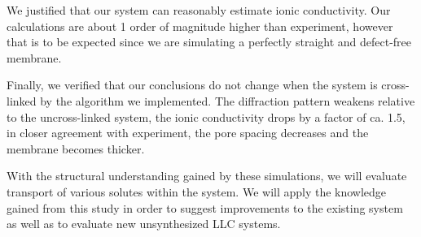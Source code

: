 \documentclass[journal=jpcbfk,manuscript=article]{achemso}
\begin{document}
  We justified that our system can reasonably estimate ionic conductivity.  Our
  calculations are about 1 order of magnitude higher than experiment, however
  that is to be expected since we are simulating a perfectly straight and
  defect-free membrane. 

  Finally, we verified that our conclusions do not change when the system is
  cross-linked by the algorithm we implemented. The diffraction pattern weakens
  relative to the uncross-linked system, the ionic conductivity drops by a factor
  of ca. 1.5, in closer agreement with experiment, the pore spacing decreases and
  the membrane becomes thicker. 


  With the structural understanding gained by these simulations, we will
  evaluate transport of various solutes within the system. We will apply the
  knowledge gained from this study in order to suggest improvements to the
  existing system as well as to evaluate new unsynthesized LLC systems.

  \clearpage
  
\end{document}
